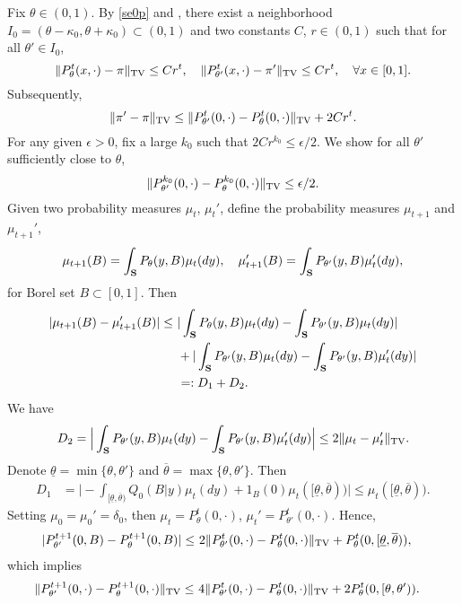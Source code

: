 \documentclass[graybox]{svmult}
\begin{document}
\proof Fix $\theta\in (0, 1)$. By \eqref{se0p} and \cite{MT09},
there exist a  neighborhood
$I_0=(\theta- \kappa_0, \theta+\kappa_0)\subset (0, 1)$  and two constants $C$, $r\in (0, 1)$    such that for all
$\theta'\in I_0$,
$$
\|P^t_\theta(x, \cdot) -\pi \|_{\rm TV} \le C r^t, \quad \|P^t_{\theta'}(x, \cdot) -\pi' \|_{\rm TV} \le C r^t, \quad \forall x \in [0, 1].
$$
Subsequently,
$$
\|\pi'-\pi\|_{\rm TV}\le  \|P_{\theta'}^t(0, \cdot)-P_\theta^t(0, \cdot)  \|_{\rm TV}+
2Cr^t.
$$ For any given $\epsilon>0$, fix a large $k_0$ such that $2Cr^{k_0}\le \epsilon/2$. We  show for all $\theta'$ sufficiently close to $\theta$,
$$
\|P^{k_0}_{\theta'} (0, \cdot)-P^{k_0}_\theta(0, \cdot)\|_{\rm TV} \le \epsilon/2. $$
Given two probability measures $\mu_t$, $\mu_t'$, define the  probability measures $\mu_{t+1}$ and $\mu_{t+1}'$,
$$\mu_{t+1}(B)=\int_{\bf S} P_\theta(y, B)\mu_t (dy), \quad
\mu'_{t+1}(B)=\int_{\bf S} P_{\theta'}(y, B)\mu_t' (dy),
$$
for Borel set $B\subset [0, 1]$.
Then
\begin{align*}
|\mu_{t+1}(B)-\mu_{t+1}'(B) | \le \ & |\int_{\bf S}
P_\theta(y, B)\mu_t (dy)-\int_{\bf S} P_{\theta'}(y, B)\mu_t (dy)|\\
&+ | \int_{\bf S} P_{\theta'}(y, B)\mu_t (dy)  - \int_{\bf S} P_{\theta'}(y, B)\mu_t' (dy)|\\
& =: D_1+D_2.
 \end{align*}
We have
\begin{align*}
D_2= \Big| \int_{\bf S} P_{\theta'}(y, B)\mu_t (dy)  - \int_{\bf S} P_{\theta'}(y, B)\mu_t' (dy)\Big|
\le 2\|\mu_t-\mu'_t\|_{\rm TV}.
\end{align*}
Denote $\underline \theta=\min\{\theta, \theta'\}$ and $\overline \theta= \max\{\theta, \theta'\}$.
Then
\begin{align*}
D_1&= \Big|-\int_{[\underline\theta, \overline\theta)}Q_0(B|y) \mu_t(dy) +1_B(0)
\mu_t ([\underline\theta, \overline\theta))\Big|
\le \mu_t([\underline\theta, \overline\theta)).
\end{align*}
Setting $\mu_0=\mu_0'=\delta_0$, then $\mu_t= P_\theta^t(0, \cdot)$, $\mu_t'= P_{\theta'}^t(0, \cdot)$.   Hence,
\begin{align}
|P_{\theta'}^{t+1}(0, B)-P_\theta^{t+1} (0, B) |
\le\ & 2\|P_{\theta'}^{t}(0, \cdot)-P_\theta^{t} (0, \cdot) \|_{\rm TV}  + P^t_\theta(0, [\underline\theta, \overline\theta)),
\end{align}
which implies
\begin{align}
\|P_{\theta'}^{t+1}(0, \cdot)-P_\theta^{t+1} (0, \cdot) \|_{\rm TV}
\le\ & 4\|P_{\theta'}^{t}(0, \cdot)-P_\theta^{t} (0, \cdot) \|_{\rm TV}  + 2P^t_\theta(0, [\theta, \theta')). \label{psisi}
\end{align}
\end{document}
